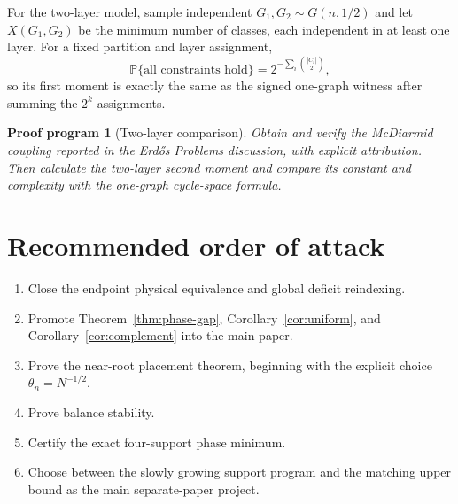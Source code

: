\documentclass[11pt]{article}
\newtheorem{program}[theorem]{Proof program}
\theoremstyle{definition}
\newcommand{\Pp}{\mathbb P}
\begin{document}
For the two-layer model, sample independent $G_1,G_2\sim G(n,1/2)$ and let
$X(G_1,G_2)$ be the minimum number of classes, each independent in at least one
layer.  For a fixed partition and layer assignment,
\[
 \Pp\{\text{all constraints hold}\}
 =2^{-\sum_i\binom{|C_i|}{2}},
\]
so its first moment is exactly the same as the signed one-graph witness after
summing the $2^k$ assignments.

\begin{program}[Two-layer comparison]
Obtain and verify the McDiarmid coupling reported in the Erd\H{o}s Problems
discussion, with explicit attribution.  Then calculate the two-layer second
moment and compare its constant and complexity with the one-graph cycle-space
formula.
\end{program}

\section{Recommended order of attack}

\begin{enumerate}[label=\arabic*.]
\item Close the endpoint physical equivalence and global deficit reindexing.
\item Promote Theorem~\ref{thm:phase-gap}, Corollary~\ref{cor:uniform}, and
Corollary~\ref{cor:complement} into the main paper.
\item Prove the near-root placement theorem, beginning with the explicit choice
$\theta_n=N^{-1/2}$.
\item Prove balance stability.
\item Certify the exact four-support phase minimum.
\item Choose between the slowly growing support program and the matching upper
bound as the main separate-paper project.
\end{enumerate}
\end{document}
